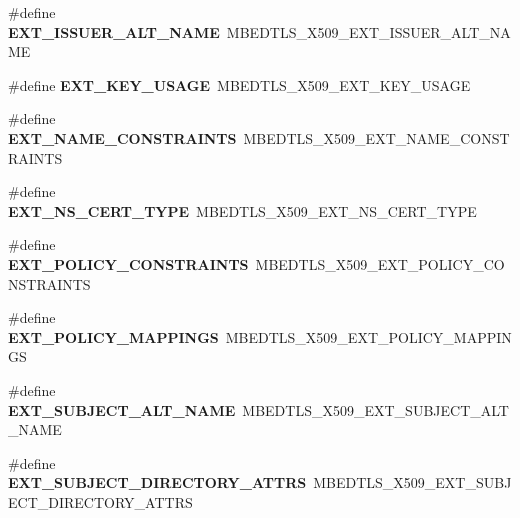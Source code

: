 \begin{DoxyCompactItemize}
\#define {\bfseries E\+X\+T\+\_\+\+I\+S\+S\+U\+E\+R\+\_\+\+A\+L\+T\+\_\+\+N\+A\+ME}~M\+B\+E\+D\+T\+L\+S\+\_\+\+X509\+\_\+\+E\+X\+T\+\_\+\+I\+S\+S\+U\+E\+R\+\_\+\+A\+L\+T\+\_\+\+N\+A\+ME
\item 
\mbox{\label{compat-1_83_8h_ac59433ad6f1280708a8409937133d4c1}} 
\#define {\bfseries E\+X\+T\+\_\+\+K\+E\+Y\+\_\+\+U\+S\+A\+GE}~M\+B\+E\+D\+T\+L\+S\+\_\+\+X509\+\_\+\+E\+X\+T\+\_\+\+K\+E\+Y\+\_\+\+U\+S\+A\+GE
\item 
\mbox{\label{compat-1_83_8h_aafe3736b82c3f5d6343379bb6a8ec000}} 
\#define {\bfseries E\+X\+T\+\_\+\+N\+A\+M\+E\+\_\+\+C\+O\+N\+S\+T\+R\+A\+I\+N\+TS}~M\+B\+E\+D\+T\+L\+S\+\_\+\+X509\+\_\+\+E\+X\+T\+\_\+\+N\+A\+M\+E\+\_\+\+C\+O\+N\+S\+T\+R\+A\+I\+N\+TS
\item 
\mbox{\label{compat-1_83_8h_ab82dcddf27656a1bc2efacc9589838db}} 
\#define {\bfseries E\+X\+T\+\_\+\+N\+S\+\_\+\+C\+E\+R\+T\+\_\+\+T\+Y\+PE}~M\+B\+E\+D\+T\+L\+S\+\_\+\+X509\+\_\+\+E\+X\+T\+\_\+\+N\+S\+\_\+\+C\+E\+R\+T\+\_\+\+T\+Y\+PE
\item 
\mbox{\label{compat-1_83_8h_a24e47a2fb35635684cc6e33c1543faa0}} 
\#define {\bfseries E\+X\+T\+\_\+\+P\+O\+L\+I\+C\+Y\+\_\+\+C\+O\+N\+S\+T\+R\+A\+I\+N\+TS}~M\+B\+E\+D\+T\+L\+S\+\_\+\+X509\+\_\+\+E\+X\+T\+\_\+\+P\+O\+L\+I\+C\+Y\+\_\+\+C\+O\+N\+S\+T\+R\+A\+I\+N\+TS
\item 
\mbox{\label{compat-1_83_8h_ad264a8f9ed49bc0a40cf21ee7213216e}} 
\#define {\bfseries E\+X\+T\+\_\+\+P\+O\+L\+I\+C\+Y\+\_\+\+M\+A\+P\+P\+I\+N\+GS}~M\+B\+E\+D\+T\+L\+S\+\_\+\+X509\+\_\+\+E\+X\+T\+\_\+\+P\+O\+L\+I\+C\+Y\+\_\+\+M\+A\+P\+P\+I\+N\+GS
\item 
\mbox{\label{compat-1_83_8h_aa86a67d1a8363fd5bbdaba523163a269}} 
\#define {\bfseries E\+X\+T\+\_\+\+S\+U\+B\+J\+E\+C\+T\+\_\+\+A\+L\+T\+\_\+\+N\+A\+ME}~M\+B\+E\+D\+T\+L\+S\+\_\+\+X509\+\_\+\+E\+X\+T\+\_\+\+S\+U\+B\+J\+E\+C\+T\+\_\+\+A\+L\+T\+\_\+\+N\+A\+ME
\item 
\mbox{\label{compat-1_83_8h_a6513410277596ad6cfdaafe753e9002f}} 
\#define {\bfseries E\+X\+T\+\_\+\+S\+U\+B\+J\+E\+C\+T\+\_\+\+D\+I\+R\+E\+C\+T\+O\+R\+Y\+\_\+\+A\+T\+T\+RS}~M\+B\+E\+D\+T\+L\+S\+\_\+\+X509\+\_\+\+E\+X\+T\+\_\+\+S\+U\+B\+J\+E\+C\+T\+\_\+\+D\+I\+R\+E\+C\+T\+O\+R\+Y\+\_\+\+A\+T\+T\+RS

\end{DoxyCompactItemize}
